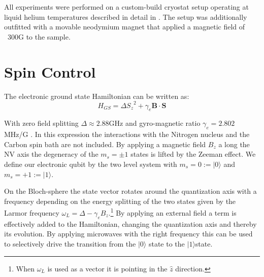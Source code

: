 All experiments were performed on a custom-build cryostat setup operating at liquid helium temperatures described in detail in \citet[chap.~3]{Bernien2014Control}. The setup was additionally outfitted with a movable neodymium magnet that applied a magnetic field of ~300G to the sample.

\section{Spin Control}
\label{spincontrol}

The electronic ground state Hamiltonian can be written as\citep{Pfaff2013Quantum}: 
 \begin{equation}
H_{GS} = \Delta {S_z}^2 + \gamma_e \mathbf{B} \cdot \mathbf{S}
\end{equation}

With zero field splitting $\Delta \approx 2.88 \mathrm{GHz}$  and gyro-magnetic ratio $\gamma_e  = 2.802$ MHz/G . In this expression the interactions with the Nitrogen nucleus and the Carbon spin bath are not included. By applying a magnetic field $B_z$ a long the NV axis the degeneracy of the  $m_s =\pm1$ states is lifted by the Zeeman effect. We define our electronic qubit  by the two level system with  $m_s=0:=|0\rangle$ and $m_s = +1 := |1\rangle$.

On the Bloch-sphere the state vector rotates around the quantization axis with a frequency depending on the energy splitting of the two states given by the Larmor frequency  $\omega_L =\Delta - \gamma_e {B_z} $.\footnote{When  $\omega_L$  is used as a vector it is pointing in the $\hat{z}$ direction.} By applying an external field a term is effectively added to the Hamiltonian, changing the quantization axis and thereby its evolution. By applying microwaves with the right frequency this can be used to selectively drive the transition from the  $|0\rangle$ state to the $|1\rangle$state\citet{Jelezko2004Observation}.

